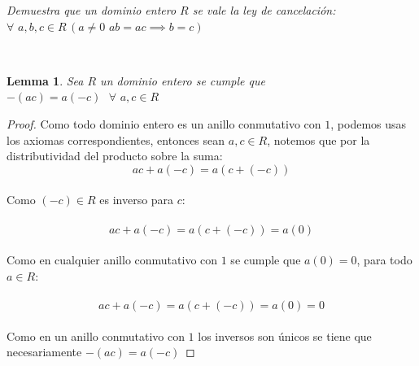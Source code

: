 \documentclass[11pt,letterpaper]{article}
\newtheorem{lemma}[theorem]{Lemma}
\begin{document}
\begin{tcolorbox}[
	title = \textcolor{black}{\textcolor{white}{Problema 5}},]
\textit{Demuestra que un dominio entero $R$ se vale la ley de cancelaci\'on:\,\,$\forall\,\,a,b,c\in R\,(a\neq 0\,\,ab=ac \implies b=c)$
}
\end{tcolorbox}\,\\
    \begin{lemma}
        Sea $R$ un dominio entero se cumple que $-(ac)=a(-c)\,\,\,\,\forall\,\,a,c\in R$ 
    \end{lemma}
    \begin{proof}
        Como todo dominio entero es un anillo conmutativo con $1$, podemos usas los axiomas correspondientes, entonces
        sean $a,c\in R$, notemos que por la distributividad del producto sobre la suma:\,\\
        \begin{equation*}
           ac+a(-c)=a(c+(-c))
        \end{equation*}\,\\
        Como $(-c)\in R$ es inverso para $c$:\,\\
        \,\\
        \begin{equation*}
            ac+a(-c)=a(c+(-c))=a(0)
        \end{equation*}\,\\
        Como en cualquier anillo conmutativo con $1$ se cumple que $a(0)=0$, para todo $a\in R$:\,\\
        \,\\
        \begin{equation*}
            ac+a(-c)=a(c+(-c))=a(0)=0
        \end{equation*}\,\\
        Como en un anillo conmutativo con $1$ los inversos son \'unicos se tiene que necesariamente $-(ac)=a(-c)$
    \end{proof}
\end{document}
